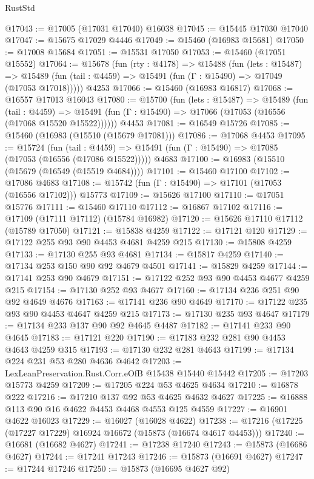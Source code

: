 \begin{lexlean}{RustStd}
\begin{coremodule}
@17043 := @17005 (@17031 @17040) @16038
@17045 := @15445 @17030 @17040
@17047 := @15675 @17029 @4446
@17049 := @15460 (@16983 @15681)
@17050 := @17008 @15684
@17051 := @15531 @17050
@17053 := @15460 (@17051 @15552)
@17064 := @15678
    (fun (rty : @4178) =>
    @15488
      (fun (lets : @15487) =>
      @15489 (fun (tail : @4459) => @15491 (fun (Γ : @15490) => @17049 (@17053 @17018)))))
    @4253
@17066 := @15460 (@16983 @16817)
@17068 := @16557 @17013 @16043
@17080 := @15700
    (fun (lets : @15487) =>
    @15489
      (fun (tail : @4459) =>
      @15491 (fun (Γ : @15490) => @17066 (@17053 (@16556 (@17068 @15520 @15522))))))
    @4453
@17081 := @16549 @15726
@17085 := @15460 (@16983 (@15510 (@15679 @17081)))
@17086 := @17068 @4453
@17095 := @15724
    (fun (tail : @4459) => @15491 (fun (Γ : @15490) => @17085 (@17053 (@16556 (@17086 @15522)))))
    @4683
@17100 := @16983 (@15510 (@15679 (@16549 (@15519 @4684))))
@17101 := @15460 @17100
@17102 := @17086 @4683
@17108 := @15742 (fun (Γ : @15490) => @17101 (@17053 (@16556 @17102))) @15773
@17109 := @15626 @17100
@17110 := @17051 @15776
@17111 := @15460 @17110
@17112 := @16867 @17102
@17116 := @17109 (@17111 @17112) (@15784 @16982)
@17120 := @15626 @17110 @17112 (@15789 @17050)
@17121 := @15838 @4259
@17122 := @17121 @120
@17129 := @17122 @255 @93 @90 @4453 @4681 @4259 @215
@17130 := @15808 @4259
@17133 := @17130 @255 @93 @4681
@17134 := @15817 @4259
@17140 := @17134 @253 @150 @90 @92 @4679 @4501
@17141 := @15829 @4259
@17144 := @17141 @253 @90 @4679
@17151 := @17122 @252 @93 @90 @4453 @4677 @4259 @215
@17154 := @17130 @252 @93 @4677
@17160 := @17134 @236 @251 @90 @92 @4649 @4676
@17163 := @17141 @236 @90 @4649
@17170 := @17122 @235 @93 @90 @4453 @4647 @4259 @215
@17173 := @17130 @235 @93 @4647
@17179 := @17134 @233 @137 @90 @92 @4645 @4487
@17182 := @17141 @233 @90 @4645
@17183 := @17121 @220
@17190 := @17183 @232 @281 @90 @4453 @4643 @4259 @315
@17193 := @17130 @232 @281 @4643
@17199 := @17134 @224 @231 @53 @280 @4636 @4642
@17203 := LexLeanPreservation.Rust.Corr.eOfB @15438 @15440 @15442
@17205 := @17203 @15773 @4259
@17209 := @17205 @224 @53 @4625 @4634
@17210 := @16878 @222
@17216 := @17210 @137 @92 @53 @4625 @4632 @4627
@17225 := @16888 @113 @90 @16 @4622 @4453 @4468 @4553 @125 @4559
@17227 := @16901 @4622 @16023
@17229 := @16027 (@16028 @4622)
@17238 := @17216 (@17225 (@17227 @17229) @16924 @16672 (@15873 (@16674 @4617 @4453)))
@17240 := @16681 (@16682 @4627)
@17241 := @17238 @17240
@17243 := @15873 (@16686 @4627)
@17244 := @17241 @17243
@17246 := @15873 (@16691 @4627)
@17247 := @17244 @17246
@17250 := @15873 (@16695 @4627 @92)

\end{coremodule}
\end{lexlean}
